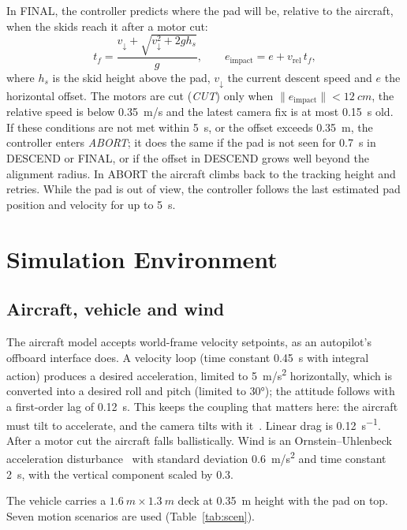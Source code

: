 \documentclass[conference]{IEEEtran}
\begin{document}
In FINAL, the controller predicts where the pad will be, relative to the aircraft, when the
skids reach it after a motor cut:
\begin{equation}
t_{f} = \frac{v_{\downarrow} + \sqrt{v_{\downarrow}^{2} + 2 g h_{s}}}{g},\qquad
e_{\text{impact}} = e + v_{\text{rel}}\, t_{f},
\end{equation}
where $h_s$ is the skid height above the pad, $v_{\downarrow}$ the current descent speed and
$e$ the horizontal offset. The motors are cut (\emph{CUT}) only when
$\lVert e_{\text{impact}} \rVert < \SI{12}{cm}$, the relative speed is below
\SI{0.35}{m/s} and the latest camera fix is at most \SI{0.15}{s} old. If these conditions
are not met within \SI{5}{s}, or the offset exceeds \SI{0.35}{m}, the controller enters
\emph{ABORT}; it does the same if the pad is not seen for \SI{0.7}{s} in DESCEND or FINAL, or
if the offset in DESCEND grows well beyond the alignment radius. In ABORT the aircraft climbs back to the tracking height and retries. While the pad is out of view,
the controller follows the last estimated pad position and velocity for up to \SI{5}{s}.

\section{Simulation Environment}

\subsection{Aircraft, vehicle and wind}
The aircraft model accepts world-frame velocity setpoints, as an autopilot's offboard
interface does. A velocity loop (time constant \SI{0.45}{s} with integral action) produces a
desired acceleration, limited to \SI{5}{m/s^2} horizontally, which is converted into a desired
roll and pitch (limited to \ang{30}); the attitude follows with a first-order lag of
\SI{0.12}{s}. This keeps the coupling that matters here: the aircraft must tilt to
accelerate, and the camera tilts with it~\cite{mahony2012multirotor}. Linear drag is \SI{0.12}{s^{-1}}. After a motor cut
the aircraft falls ballistically. Wind is an Ornstein--Uhlenbeck acceleration
disturbance~\cite{uhlenbeck1930theory} with standard deviation \SI{0.6}{m/s^2} and time
constant \SI{2}{s}, with the vertical component scaled by 0.3.

The vehicle carries a $\SI{1.6}{m}\times\SI{1.3}{m}$ deck at \SI{0.35}{m} height with the
pad on top. Seven motion scenarios are used (Table~\ref{tab:scen}).
\end{document}

